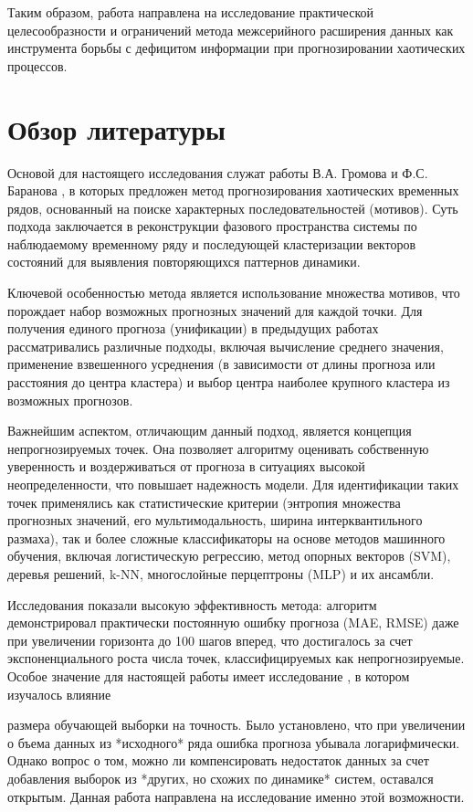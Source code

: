 \documentclass[a4paper,12pt]{extarticle}
\begin{document}
Таким образом, работа направлена на исследование практической целесообразности и ограничений метода межсерийного расширения данных как инструмента борьбы с дефицитом информации при прогнозировании хаотических процессов.

\section{Обзор литературы}

Основой для настоящего исследования служат работы В.А. Громова и Ф.С. Баранова  \cite{GromovBaranov2023}
, в которых предложен метод прогнозирования хаотических временных рядов,
 основанный на поиске характерных последовательностей (мотивов).
  Суть подхода заключается в реконструкции фазового пространства
   системы по наблюдаемому временному ряду и последующей кластеризации
   векторов состояний для выявления повторяющихся паттернов динамики.

Ключевой особенностью метода является использование множества мотивов,
что порождает набор возможных прогнозных значений для каждой точки.
 Для получения единого прогноза (унификации) в предыдущих работах
  рассматривались различные подходы, включая вычисление среднего
   значения, применение взвешенного усреднения (в зависимости от длины прогноза или расстояния
    до центра кластера) и выбор центра наиболее крупного кластера из возможных прогнозов.

Важнейшим аспектом, отличающим данный подход, является концепция
непрогнозируемых точек. Она позволяет алгоритму оценивать собственную уверенность
 и воздерживаться от прогноза в ситуациях высокой неопределенности,
 что повышает надежность модели. Для идентификации таких точек применялись
 как статистические критерии (энтропия множества прогнозных значений, его
 мультимодальность, ширина интерквантильного размаха), так и более сложные
 классификаторы на основе методов машинного обучения, включая логистическую регрессию,
  метод опорных векторов (SVM), деревья решений, k-NN, многослойные перцептроны (MLP) и их ансамбли.\cite{Wang2019}

Исследования показали высокую эффективность метода: алгоритм демонстрировал
практически постоянную ошибку прогноза (MAE, RMSE) даже при увеличении
горизонта до 100 шагов вперед, что достигалось за счет экспоненциального
 роста числа точек, классифицируемых как непрогнозируемые. Особое значение
  для настоящей работы имеет исследование  \cite{Gromov2021}, в котором изучалось влияние

  размера обучающей выборки на точность. Было установлено, что при увеличении о
  бъема данных из *исходного* ряда ошибка прогноза убывала логарифмически. Однако
  вопрос о том, можно ли компенсировать недостаток данных за счет добавления
  выборок из *других, но схожих по динамике* систем, оставался открытым.
 Данная работа направлена на исследование именно этой возможности.
\end{document}
